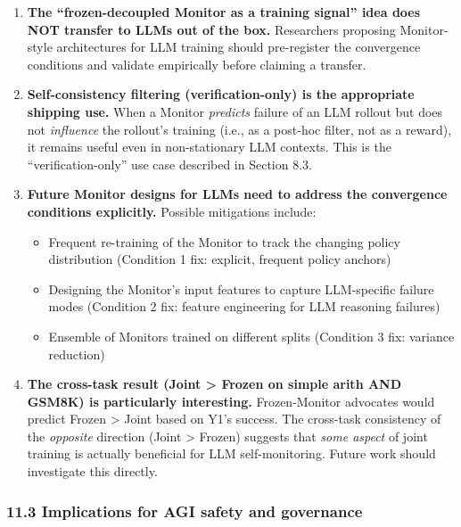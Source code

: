 \documentclass[
]{article}
\providecommand{\tightlist}{%
  \setlength{\itemsep}{0pt}\setlength{\parskip}{0pt}}
\begin{document}
\begin{enumerate}
\def\labelenumi{\arabic{enumi}.}
\item
  \textbf{The ``frozen-decoupled Monitor as a training signal'' idea
  does NOT transfer to LLMs out of the box.} Researchers proposing
  Monitor-style architectures for LLM training should pre-register the
  convergence conditions and validate empirically before claiming a
  transfer.
\item
  \textbf{Self-consistency filtering (verification-only) is the
  appropriate shipping use.} When a Monitor \emph{predicts} failure of
  an LLM rollout but does not \emph{influence} the rollout's training
  (i.e., as a post-hoc filter, not as a reward), it remains useful even
  in non-stationary LLM contexts. This is the ``verification-only'' use
  case described in Section 8.3.
\item
  \textbf{Future Monitor designs for LLMs need to address the
  convergence conditions explicitly.} Possible mitigations include:

  \begin{itemize}
  \tightlist
  \item
    Frequent re-training of the Monitor to track the changing policy
    distribution (Condition 1 fix: explicit, frequent policy anchors)
  \item
    Designing the Monitor's input features to capture LLM-specific
    failure modes (Condition 2 fix: feature engineering for LLM
    reasoning failures)
  \item
    Ensemble of Monitors trained on different splits (Condition 3 fix:
    variance reduction)
  \end{itemize}
\item
  \textbf{The cross-task result (Joint \textgreater{} Frozen on simple
  arith AND GSM8K) is particularly interesting.} Frozen-Monitor
  advocates would predict Frozen \textgreater{} Joint based on Y1's
  success. The cross-task consistency of the \emph{opposite} direction
  (Joint \textgreater{} Frozen) suggests that \emph{some aspect} of
  joint training is actually beneficial for LLM self-monitoring. Future
  work should investigate this directly.
\end{enumerate}

\subsubsection{11.3 Implications for AGI safety and
governance}\label{implications-for-agi-safety-and-governance}
\end{document}
